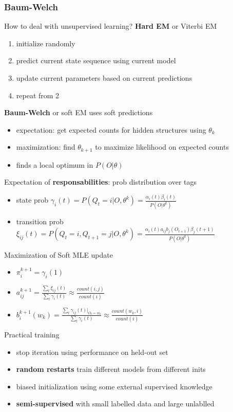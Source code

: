 \documentclass[]{article}
\theoremstyle{definition}
\begin{document}
\subsubsection{Baum-Welch}%
\label{ssub:baum_welch}

How to deal with unsupervised learning? \textbf{Hard EM} or Viterbi EM
\begin{enumerate}
    \item initialize randomly
    \item predict current state sequence using current model
    \item update current parameters based on current predictions
    \item repeat from 2
\end{enumerate}

\textbf{Baum-Welch} or soft EM uses soft predictions
\begin{itemize}
    \item expectation: get expected counts for hidden structures using $\theta_k$
    \item maximization: find $\theta_{k+1}$ to maximize likelihood on expected counts
    \item finds a local optimum in $P(O|\theta)$
\end{itemize}

Expectation of \textbf{responsabilities}: prob distribution over tags
\begin{itemize}
    \item state prob $\gamma_i(t) = P(Q_t = i|O, \theta^k) = \frac{\alpha_i(t)\beta_i(t)}{P(O|\theta^k)} $
    \item transition prob $\xi_{ij}(t) = P(Q_t = i, Q_{t+1} = j| O, \theta^k) = \frac{\alpha_i(t) a_{ij} b_j(O_{t+1})\beta_j(t+1)}{P(O|\theta^k)} $
\end{itemize}

Maximization of Soft MLE update
\begin{itemize}
    \item $\pi_i^{k+1} = \gamma_i(1)$
    \item $a_{ij}^{k+1} = \frac{\sum_t \xi_{ij}(t)}{\sum_t \gamma_i(t)} \approx \frac{count(i,j)}{count(i)} $
    \item $b_i^{k+1}(w_k) = \frac{\sum_t \gamma_{ij}(t)|_{O_t = w_k}}{\sum_t \gamma_i(t)} \approx \frac{count(w_k, i)}{count(i)}$
\end{itemize}

Practical training
\begin{itemize}
    \item stop iteration using performance on held-out set
    \item \textbf{random restarts} train different models from different inits
    \item biased initialization using some external supervised knowledge
    \item \textbf{semi-supervised} with small labelled data and large unlablled
\end{itemize}
\end{document}
